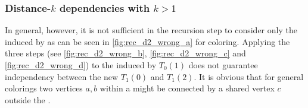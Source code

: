 	\subsubsection{Distance-$k$ dependencies with $k>1$}
In general, however, it is not sufficient in the recursion step to consider only the \subgraphs induced by \levelGroups as can be seen in \cref{fig:rec_d2_wrong_a} for \DTWO coloring. Applying  the three steps (see \cref{fig:rec_d2_wrong_b}, \cref{fig:rec_d2_wrong_c} and \cref{fig:rec_d2_wrong_d})  to  the \subgraph induced by $T_0(1)$ does not guarantee \DTWO independency between the new \levelGroups $T_1(0)$ and $T_1(2)$. It is obvious that for general \DK colorings two vertices $a,b$ within a \levelGroup might be connected by a shared vertex $c$ outside the \levelGroup. 
